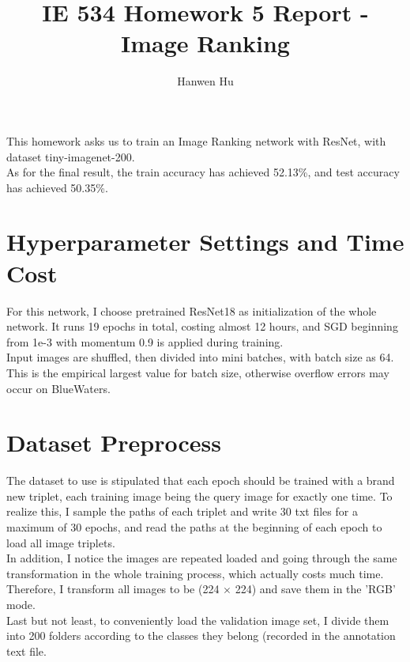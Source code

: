 \documentclass[15pt]{article}
\title{IE 534 Homework 5 Report - Image Ranking}
\author{Hanwen Hu}
\begin{document}
\maketitle

\noindent This homework asks us to train an Image Ranking network with ResNet, with dataset tiny-imagenet-200.\\
As for the final result, the train accuracy has achieved 52.13\%, and test accuracy has achieved 50.35\%.

\section{Hyperparameter Settings and Time Cost}
For this network, I choose pretrained ResNet18 as initialization of the whole network. It runs 19 epochs in total, costing almost 12 hours, and SGD beginning from 1e-3 with momentum 0.9 is applied during training.\\
Input images are shuffled, then divided into mini batches, with batch size as 64. This is the empirical largest value for batch size, otherwise overflow errors may occur on BlueWaters. \\

\section{Dataset Preprocess}
The dataset to use is stipulated that each epoch should be trained with a brand new triplet, each training image being the query image for exactly one time. To realize this, I sample the paths of each triplet and write 30 txt files for a maximum of 30 epochs, and read the paths at the beginning of each epoch to load all image triplets.\\
In addition, I notice the images are repeated loaded and going through the same transformation in the whole training process, which actually costs much time. Therefore, I transform all images to be (224 $\times$ 224) and save them in the 'RGB' mode.\\
Last but not least, to conveniently load the validation image set, I divide them into 200 folders according to the classes they belong (recorded in the annotation text file.
\end{document}
